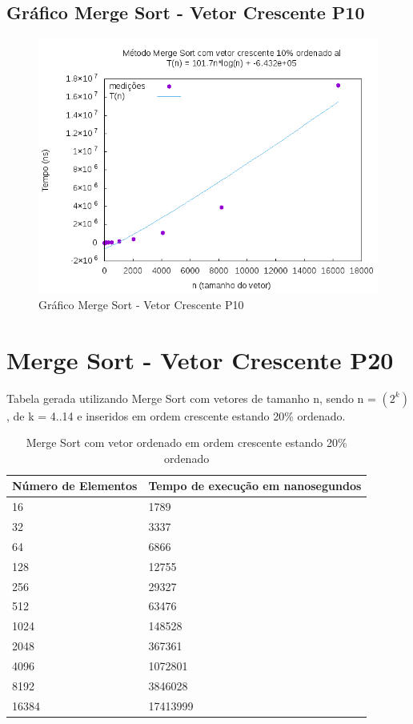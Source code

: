 \documentclass[12pt,a4paper,twoside]{report}
\begin{document}
\subsection{Gráfico Merge Sort - Vetor Crescente P10}
\begin{figure}[H]
    \centering
    \includegraphics[width=0.7\linewidth]{graficos/MergeSort/vIntCrescenteP10/vIntCrescenteP10.png}
  \caption{Gráfico Merge Sort - Vetor Crescente P10}
\end{figure}

\section{Merge Sort - Vetor Crescente P20}
Tabela gerada utilizando Merge Sort com vetores de tamanho n, sendo n = $(2^k)$, de k = 4..14 e inseridos em ordem crescente estando 20\% ordenado.
\begin{table}[H]
\centering
\caption{Merge Sort com vetor ordenado em ordem crescente estando 20\% ordenado}
\label{my-label}
\begin{tabular}{|l|l|}
\hline
\multicolumn{1}{|c|}{\textbf{Número de Elementos}} & \multicolumn{1}{c|}{\textbf{Tempo de execução em nanosegundos}} \\ \hline
16 & 1789 \\ \hline
32 & 3337 \\ \hline
64 & 6866 \\ \hline
128 & 12755 \\ \hline
256 & 29327 \\ \hline
512 & 63476 \\ \hline
1024 & 148528 \\ \hline
2048 & 367361 \\ \hline
4096 & 1072801 \\ \hline
8192 & 3846028 \\ \hline
16384 & 17413999 \\ \hline
\end{tabular}
\end{table}
\end{document}
